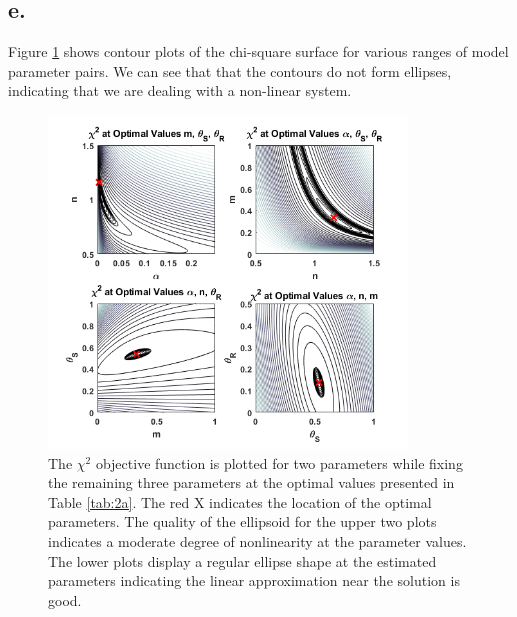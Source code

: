 \documentclass{article}
\begin{document}
\newpage

\subsection{e.}
Figure \ref{contours} shows contour plots of the chi-square surface for various ranges of model parameter pairs. We can see that that the contours do not form ellipses, indicating that we are dealing with a non-linear system. 


\begin{figure}[!hb]
    \centering
    \includegraphics[width = 0.85\textwidth]{2e.png}
    \caption{The $\chi^2$ objective function is plotted for two parameters while fixing the remaining three parameters at the optimal values presented in Table \ref{tab:2a}. The red X indicates the location of the optimal parameters. The quality of the ellipsoid for the upper two plots indicates a moderate degree of nonlinearity at the parameter values. The lower plots display a regular ellipse shape at the estimated parameters indicating the linear approximation near the solution is good. }
    \label{contours}
\end{figure}


\end{document}
